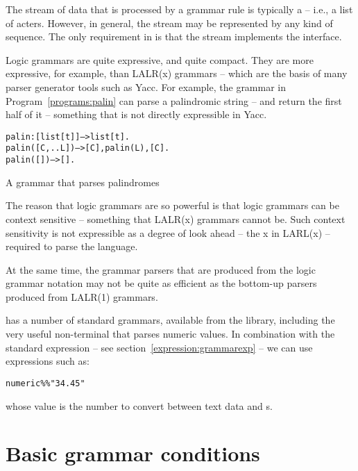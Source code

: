 The stream of data that is processed by a grammar rule is typically a  -- i.e., a list of acters. However, in general, the stream may be represented by any kind of sequence. The only requirement in \go is that the stream implements the  interface.

Logic grammars are quite expressive, and quite compact. They are more expressive, for example, than LALR(x) grammars -- which are the basis of many parser generator tools such as Yacc. For example, the grammar in Program~\vref{programs:palin} can parse a palindromic string -- and return the first half of it -- something that is not directly expressible in Yacc.
\begin{program}
\vspace{0.5ex}
\begin{alltt}
palin:[list[t]]-->list[t].
palin([C,..L]) --> [C], palin(L), [C].
palin([]) --> [].
\end{alltt}
\vspace{-2ex}
\caption{A grammar that parses palindromes}
\label{programs:palin}
\end{program}

\begin{aside}
The reason that logic grammars are so powerful is that logic grammars can be context sensitive -- something that LALR(x) grammars cannot be. Such context sensitivity is not expressible as a degree of look ahead -- the x in LARL(x) -- required to parse the language.

At the same time, the grammar parsers that are produced from the logic grammar notation may not be quite as efficient as the bottom-up parsers produced from LALR(1) grammars.
\end{aside}

\go has a number of standard grammars, available from the  library, including the very useful  non-terminal that parses numeric values. In combination with the standard expression \q{\%\%} -- see section~\vref{expression:grammarexp} -- we can use expressions such as:
\begin{alltt}
numeric \%\% "34.45"
\end{alltt}
whose value is the number  to convert between text data and s.


\section{Basic grammar conditions}
